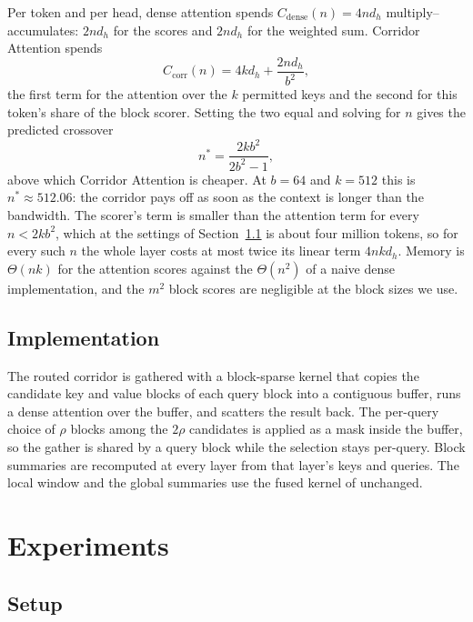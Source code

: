 \documentclass[11pt]{article}
\begin{document}
Per token and per head, dense attention spends
$C_{\mathrm{dense}}(n) = 4 n d_h$ multiply--accumulates: $2 n d_h$ for the
scores and $2 n d_h$ for the weighted sum. Corridor Attention spends
\begin{equation}\label{eq:cost}
  C_{\mathrm{corr}}(n) = 4 k d_h + \frac{2 n d_h}{b^{2}} ,
\end{equation}
the first term for the attention over the $k$ permitted keys and the second
for this token's share of the block scorer. Setting the two equal and
solving for $n$ gives the predicted crossover
\begin{equation}\label{eq:crossover}
  n^{*} = \frac{2 k b^{2}}{2 b^{2} - 1} ,
\end{equation}
above which Corridor Attention is cheaper. At $b = 64$ and $k = 512$ this is
$n^{*} \approx 512.06$: the corridor pays off as soon as the context is
longer than the bandwidth. The scorer's term is smaller than the attention
term for every $n < 2 k b^{2}$, which at the settings of
Section~\ref{sec:setup} is about four million tokens, so for every such $n$
the whole layer costs at most twice its linear term $4 n k d_h$. Memory is
$\Theta(nk)$ for the attention scores against the $\Theta(n^2)$ of a naive
dense implementation, and the $m^2$ block scores are negligible at the block
sizes we use.

\subsection{Implementation}\label{sec:impl}

The routed corridor is gathered with a block-sparse kernel that copies the
candidate key and value blocks of each query block into a contiguous buffer,
runs a dense attention over the buffer, and scatters the result back. The
per-query choice of $\rho$ blocks among the $2\rho$ candidates is applied as
a mask inside the buffer, so the gather is shared by a query block while the
selection stays per-query. Block summaries are recomputed at every layer
from that layer's keys and queries. The local window and the global
summaries use the fused kernel of \citet{dao2022flashattention} unchanged.

\section{Experiments}\label{sec:experiments}

\subsection{Setup}\label{sec:setup}
\end{document}
